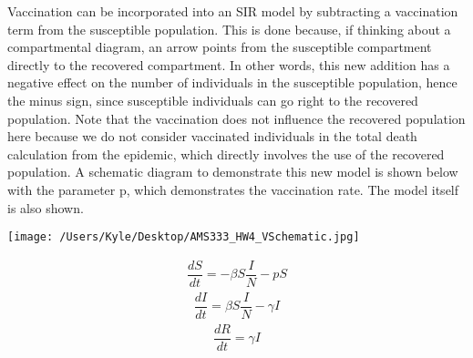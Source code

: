 \documentclass[12pt]{article}
\begin{document}
Vaccination can be incorporated into an SIR model by subtracting a vaccination term from the susceptible population. This is done because, if thinking about a compartmental diagram, an arrow points from the susceptible compartment directly to the recovered compartment. In other words, this new addition has a negative effect on the number of individuals in the susceptible population, hence the minus sign, since susceptible individuals can go right to the recovered population. Note that the vaccination does not influence the recovered population here because we do not consider vaccinated individuals in the total death calculation from the epidemic, which directly involves the use of the recovered population. A schematic diagram to demonstrate this new model is shown below with the parameter p, which demonstrates the vaccination rate. The model itself is also shown.
\begin{center}
   \texttt{[image: /Users/Kyle/Desktop/AMS333\_HW4\_VSchematic.jpg]}
\end{center}

\begin{gather*}
\dfrac{dS}{dt} = -{\beta}S\dfrac{I}{N}-pS
\end{gather*}
\begin{gather*}
\dfrac{dI}{dt} = {\beta}S\dfrac{I}{N}-{\gamma}I
\end{gather*}
\begin{gather*}
\dfrac{dR}{dt} = {\gamma}I
\end{gather*}
\end{document}
